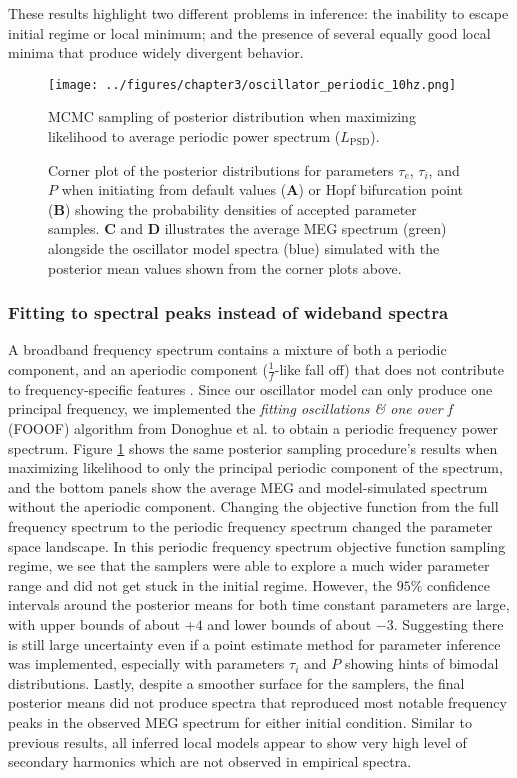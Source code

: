 These results highlight two different problems in inference: the inability to escape initial regime or local minimum; and the presence of several equally good local minima that produce widely divergent behavior.

\begin{figure}
    \centering
    \texttt{[image: ../figures/chapter3/oscillator\_periodic\_10hz.png]}
   \caption{MCMC sampling of posterior distribution when maximizing likelihood to average periodic power spectrum ($L_{\textrm{PSD}}$).}
    \caption*{Corner plot of the posterior distributions for parameters $\tau_e$, $\tau_i$, and $P$ when initiating from default values (\textbf{A}) or Hopf bifurcation point (\textbf{B}) showing the probability densities of accepted parameter samples. \textbf{C} and \textbf{D} illustrates the average MEG spectrum (green) alongside the oscillator model spectra (blue) simulated with the posterior mean values shown from the corner plots above.}
    \label{fig:oscillator_periodic}
\end{figure}

\subsubsection{Fitting to spectral peaks instead of wideband spectra}
A broadband frequency spectrum contains a mixture of both a periodic component, and an aperiodic component ($\frac{1}{f}$-like fall off) that does not contribute to frequency-specific features \cite{donoghue_parameterizing_2020}. Since our oscillator model can only produce one principal frequency, we implemented the \emph{fitting oscillations \& one over f} (FOOOF) algorithm from Donoghue et al. \cite{donoghue_parameterizing_2020} to obtain a periodic frequency power spectrum. Figure \ref{fig:oscillator_periodic} shows the same posterior sampling procedure's results when maximizing likelihood to only the principal periodic component of the spectrum, and the bottom panels show the average MEG and model-simulated spectrum without the aperiodic component. Changing the objective function from the full frequency spectrum to the periodic frequency spectrum changed the parameter space landscape. In this periodic frequency spectrum objective function sampling regime, we see that the samplers were able to explore a much wider parameter range and did not get stuck in the initial regime. However, the $95\%$ confidence intervals around the posterior means for both time constant parameters are large, with upper bounds of about $+4$ and lower bounds of about $-3$. Suggesting there is still large uncertainty even if a point estimate method for parameter inference was implemented, especially with parameters $\tau_i$ and $P$ showing hints of bimodal distributions. Lastly, despite a smoother surface for the samplers, the final posterior means did not produce spectra that reproduced most notable frequency peaks in the observed MEG spectrum for either initial condition. Similar to previous results, all inferred local models appear to show very high level of secondary harmonics which are not observed in empirical spectra. 


